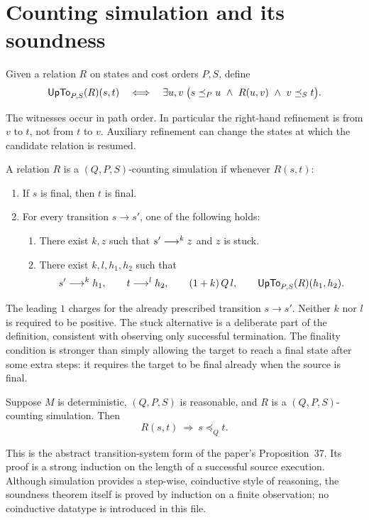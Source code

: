 \section{Counting simulation and its soundness}

\begin{definition}[Up-to closure]\label{term:up-to}
Given a relation $R$ on states and cost orders $P,S$, define
\[
 \mathsf{UpTo}_{P,S}(R)(s,t)\quad\Longleftrightarrow\quad
 \exists u,v\;\bigl(s\preceq_P u\ \land\ R(u,v)\ \land\ v\preceq_S t\bigr).
\]
\end{definition}
The witnesses occur in path order. In particular the right-hand refinement
is from $v$ to $t$, not from $t$ to $v$. Auxiliary refinement can change the
states at which the candidate relation is resumed.

\begin{definition}\label{term:simulation}
A relation $R$ is a $(Q,P,S)$-counting simulation if whenever $R(s,t)$:
\begin{enumerate}[label=\textup{(\Alph*)}]
\item If $s$ is final, then $t$ is final.
\item For every transition $s\to s'$, one of the following holds:
\begin{enumerate}[label=\textup{(\roman*)}]
\item There exist $k,z$ such that $s'\mathrel{\longrightarrow^{k}}z$ and $z$ is stuck.
\item There exist $k,l,h_1,h_2$ such that
\[
 s'\mathrel{\longrightarrow^{k}}h_1,\qquad t\mathrel{\longrightarrow^{l}}h_2,\qquad
 (1+k)\,Q\,l,\qquad \mathsf{UpTo}_{P,S}(R)(h_1,h_2).
\]
\end{enumerate}
\end{enumerate}
\end{definition}
The leading $1$ charges for the already prescribed transition $s\to s'$.
Neither $k$ nor $l$ is required to be positive. The stuck alternative is a
deliberate part of the definition, consistent with observing only successful
termination. The finality condition is stronger than simply allowing the
target to reach a final state after some extra steps: it requires the target
to be final already when the source is final.

\begin{theorem}\label{thm:soundness}
Suppose $M$ is deterministic, $(Q,P,S)$ is reasonable, and $R$ is a
$(Q,P,S)$-counting simulation. Then
\[
 R(s,t)\ \Longrightarrow\ s\preceq_Q t.
\]
\end{theorem}
This is the abstract transition-system form of the paper's Proposition~37.
Its proof is a strong induction on the length of a successful source
execution. Although simulation provides a step-wise, coinductive style of
reasoning, the soundness theorem itself is proved by induction on a finite
observation; no coinductive datatype is introduced in this file.

